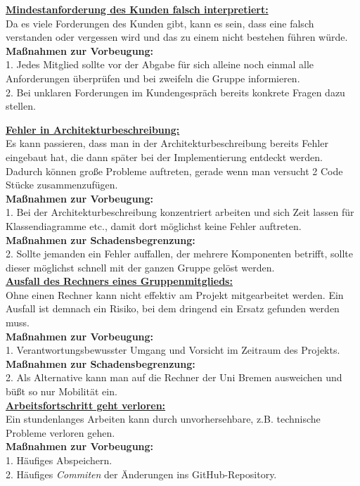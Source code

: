 \documentclass[fontsize=12pt,paper=a4,twoside]{scrartcl}
\begin{document}
\bigskip 

\textbf{\underline{Mindestanforderung des Kunden falsch interpretiert:}}\\
Da es viele Forderungen des Kunden gibt, kann es sein, dass eine falsch verstanden oder vergessen wird und das zu einem nicht bestehen führen würde.\\
\textbf{Maßnahmen zur Vorbeugung:}\\
1. Jedes Mitglied sollte vor der Abgabe für sich alleine noch einmal alle Anforderungen überprüfen und bei zweifeln die Gruppe informieren.\\
2. Bei unklaren Forderungen im Kundengespräch bereits konkrete Fragen dazu stellen.\\

\bigskip

\textbf{\underline{Fehler in Architekturbeschreibung:}}\\
Es kann passieren, dass man in der Architekturbeschreibung bereits Fehler eingebaut hat, die dann später bei der Implementierung entdeckt werden. Dadurch können große Probleme auftreten, gerade wenn man versucht 2 Code Stücke zusammenzufügen.\\
\textbf{Maßnahmen zur Vorbeugung:}\\
1. Bei der Architekturbeschreibung konzentriert arbeiten und sich Zeit lassen für Klassendiagramme etc., damit dort möglichst keine Fehler auftreten.\\
\textbf{Maßnahmen zur Schadensbegrenzung:}\\
2. Sollte jemanden ein Fehler auffallen, der mehrere Komponenten betrifft, sollte dieser möglichst schnell mit der ganzen Gruppe gelöst werden.\\ 

\textbf{\underline{Ausfall des Rechners eines Gruppenmitglieds:}}\\
Ohne einen Rechner kann nicht effektiv am Projekt mitgearbeitet werden. Ein Ausfall ist demnach ein Risiko, bei dem dringend ein Ersatz gefunden werden muss.\\
\textbf{Maßnahmen zur Vorbeugung:}\\
1. Verantwortungsbewusster Umgang und Vorsicht im Zeitraum des Projekts.\\
\textbf{Maßnahmen zur Schadensbegrenzung:}\\
2. Als Alternative kann man auf die Rechner der Uni Bremen ausweichen und büßt so nur Mobilität ein.\\ 

\textbf{\underline{Arbeitsfortschritt geht verloren:}}\\
Ein stundenlanges Arbeiten kann durch unvorhersehbare, z.B. technische Probleme verloren gehen.\\
\textbf{Maßnahmen zur Vorbeugung:}\\
1. Häufiges Abspeichern.\\
2. Häufiges \textit{Commiten} der Änderungen ins GitHub-Repository.
\end{document}
